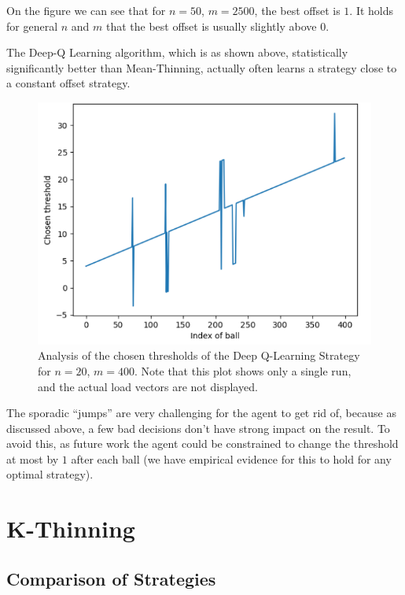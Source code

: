 On the figure we can see that for $n=50$, $m=2500$, the best offset is $1$. It holds for general $n$ and $m$ that the best offset is usually slightly above $0$.

The Deep-Q Learning algorithm, which is as shown above, statistically significantly better than Mean-Thinning, actually often learns a strategy close to a constant offset strategy.


\begin{figure}[h!] \label{two-thinning-training-curve}
    \centering
    \includegraphics[scale=1.0]{Chapter4/Figs/dqn_learnt_thresholds.png}
    \caption{Analysis of the chosen thresholds of the Deep Q-Learning Strategy for $n=20$, $m=400$. Note that this plot shows only a single run, and the actual load vectors are not displayed.}
\end{figure}


The sporadic ``jumps'' are very challenging for the agent to get rid of, because as discussed above, a few bad decisions don't have strong impact on the result. To avoid this, as future work the agent could be constrained to change the threshold at most by $1$ after each ball (we have empirical evidence for this to hold for any optimal strategy).



\section{K-Thinning}



\subsection{Comparison of Strategies}


